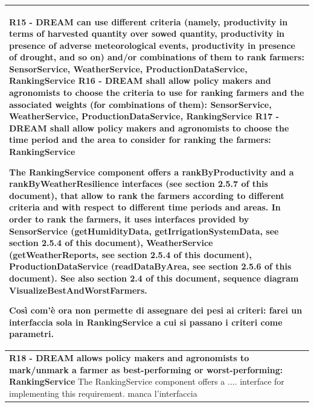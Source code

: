 \documentclass{article}
\begin{document}
\begin{longtable}[c]{|m{11.75cm}|}
    \textbf{R15 - DREAM can use different criteria (namely, productivity in terms of harvested quantity over sowed quantity, productivity in presence of adverse meteorological events, productivity in presence of drought, and so on) and/or combinations of them to rank farmers: SensorService, WeatherService, ProductionDataService, RankingService
    \newline \newline
    R16 - DREAM shall allow policy makers and agronomists to choose the criteria to use for ranking farmers and the associated weights (for combinations of them): SensorService, WeatherService, ProductionDataService, RankingService
    \newline\newline
    R17 - DREAM shall allow policy makers and agronomists to choose the time period and the area to consider for ranking the farmers: RankingService}
    \newline\newline
    
    The RankingService component offers a rankByProductivity and a rankByWeatherResilience interfaces (see section 2.5.7 of this document), that allow to rank the farmers according to different criteria and with respect to different time periods and areas. In order to rank the farmers, it uses interfaces provided by SensorService (getHumidityData, getIrrigationSystemData, see section 2.5.4 of this document), WeatherService (getWeatherReports, see section 2.5.4 of this document), ProductionDataService (readDataByArea, see section 2.5.6 of this document). See also section 2.4 of this document, sequence diagram VisualizeBestAndWorstFarmers.
    
    \color{red}
    Così com'è ora non permette di assegnare dei pesi ai criteri: farei un interfaccia sola in RankingService a cui si passano i criteri come parametri.
    \color{black}\\
    \hline
    
    \textbf{R18 - DREAM allows policy makers and agronomists to mark/unmark a farmer as best-performing or worst-performing: RankingService}
    \newline\newline
    The RankingService component offers a .... interface for implementing this requirement.
    \color{red}
    manca l'interfaccia
    \color{black}\\
    \hline
    

\end{longtable}
\end{document}
